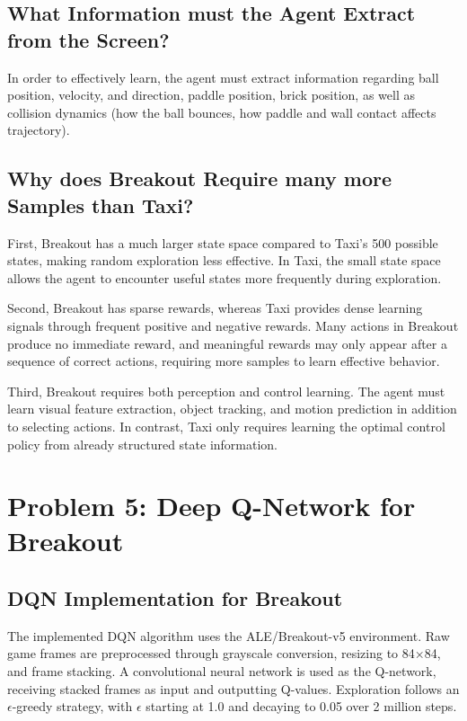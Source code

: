 \documentclass[11pt]{article}
\begin{document}
\subsection*{What Information must the Agent Extract from the Screen?}

In order to effectively learn, the agent must extract information regarding ball position, velocity, and direction, paddle position, brick position, as well as collision dynamics (how the ball bounces, how paddle and wall contact affects trajectory).

\subsection*{Why does Breakout Require many more Samples than Taxi?}

First, Breakout has a much larger state space compared to Taxi's 500 possible states, making random exploration less effective. In Taxi, the small state space allows the agent to encounter useful states more frequently during exploration.

Second, Breakout has sparse rewards, whereas Taxi provides dense learning signals through frequent positive and negative rewards. Many actions in Breakout produce no immediate reward, and meaningful rewards may only appear after a sequence of correct actions, requiring more samples to learn effective behavior.

Third, Breakout requires both perception and control learning. The agent must learn visual feature extraction, object tracking, and motion prediction in addition to selecting actions. In contrast, Taxi only requires learning the optimal control policy from already structured state information.

\section*{Problem 5: Deep Q-Network for Breakout}

\subsection*{DQN Implementation for Breakout}

The implemented DQN algorithm uses the ALE/Breakout-v5 environment. Raw game frames are preprocessed through grayscale conversion, resizing to 84×84, and frame stacking. A convolutional neural network is used as the Q-network, receiving stacked frames as input and outputting Q-values. Exploration follows an $\epsilon$-greedy strategy, with $\epsilon$ starting at 1.0 and decaying to 0.05 over 2 million steps.
\end{document}

